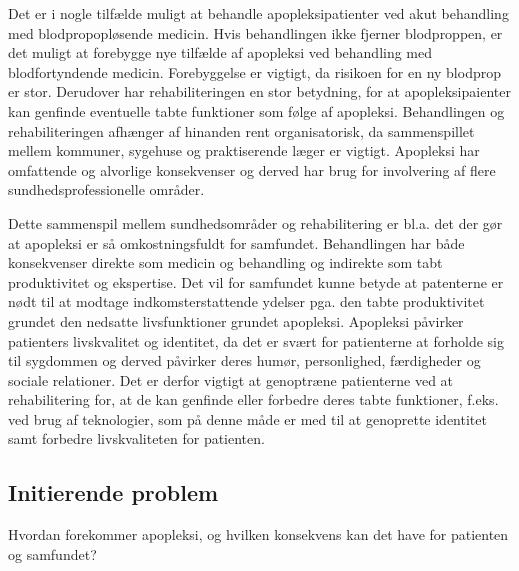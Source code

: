 Det er i nogle tilfælde muligt at behandle apopleksipatienter ved akut behandling med blodpropopløsende medicin. Hvis behandlingen ikke fjerner blodproppen, er det muligt at forebygge nye tilfælde af apopleksi ved behandling med blodfortyndende medicin. Forebyggelse er vigtigt, da risikoen for en ny blodprop er stor. Derudover har rehabiliteringen en stor betydning, for at apopleksipaienter kan genfinde eventuelle tabte funktioner som følge af apopleksi. Behandlingen og rehabiliteringen afhænger af hinanden rent organisatorisk, da sammenspillet mellem kommuner, sygehuse og praktiserende læger er vigtigt. Apopleksi har omfattende og alvorlige konsekvenser og derved har brug for involvering af flere sundhedsprofessionelle områder.

Dette sammenspil mellem sundhedsområder og rehabilitering er bl.a. det der gør at apopleksi er så omkostningsfuldt for samfundet. Behandlingen har både konsekvenser direkte som medicin og behandling og indirekte som tabt produktivitet og ekspertise. Det vil for samfundet kunne betyde at patenterne er nødt til at modtage indkomsterstattende ydelser pga. den tabte produktivitet grundet den nedsatte livsfunktioner grundet apopleksi.
Apopleksi påvirker patienters livskvalitet og identitet, da det er svært for patienterne at forholde sig til sygdommen og derved påvirker deres humør, personlighed, færdigheder og sociale relationer. Det er derfor vigtigt at genoptræne patienterne ved at rehabilitering for, at de kan genfinde eller forbedre deres tabte funktioner, f.eks. ved brug af teknologier, som på denne måde er med til at genoprette identitet samt forbedre livskvaliteten for patienten. 

\subsection{Initierende problem}
Hvordan forekommer apopleksi, og hvilken konsekvens kan det have for patienten og samfundet?